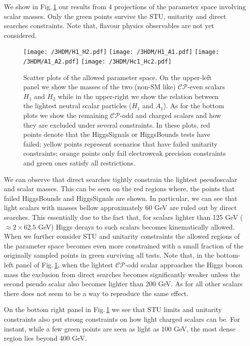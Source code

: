 \documentclass[10pt]{report}
\begin{document}
We show in Fig.\,\ref{fig:H1_A1_Plots} our results from 4 projections of the parameter space involving scalar masses. 
%
Only the green points survive the STU, unitarity and direct searches constraints. Note that, flavour physics observables are not yet considered.  
%
\begin{figure}[!htb]
	\centering
	\texttt{[image: /3HDM/H1\_H2.pdf]}
	\texttt{[image: /3HDM/H1\_A1.pdf]}
	\texttt{[image: /3HDM/A1\_A2.pdf]}
	\texttt{[image: /3HDM/Hc1\_Hc2.pdf]}
	\caption{Scatter plots of the allowed parameter space. On the upper-left panel we show the masses of the two (non-SM like) $\mathcal{CP}$-even scalars $H_1$ and $H_2$ while in the upper-right we show the relation between the lightest neutral scalar particles ($H_1$ and $A_1$). As for the bottom plots we show the remaining $\mathcal{CP}$-odd and charged scalars and how they are excluded under several constraints. In these plots, red points denote that the HiggsSignals or HiggsBounds tests have failed; yellow points represent scenarios that have failed unitarity constraints; orange points only fail electroweak precision constraints and green ones satisfy all restrictions.}
	\label{fig:H1_A1_Plots}
\end{figure}	

We can observe that direct searches tightly constrain the lightest pseudoscalar and scalar masses.
%
This can be seen on the red regions where, the points that failed HiggsBounds and HiggsSignals are shown. 
%
In particular, we can see that light scalars with masses bellow approximately 60 GeV are ruled out by direct searches. This essentially due to the fact that, for scalars lighter than 125 GeV ($\approx 2 \times 62.5$ GeV) Higgs decays to such scalars becomes kinematically allowed.
%
When we further consider STU and unitarity constraints the allowed regions of the parameter space becomes even more constrained with a small fraction of the originally sampled points in green surviving all tests.
%
Note that, in the bottom-left panel of Fig.\,\ref{fig:H1_A1_Plots}, when the lightest $\mathcal{CP}$-odd scalar approaches the Higgs boson mass the exclusion from direct searches becomes significantly weaker unless the second pseudo scalar also becomes lighter than 200 GeV. 
%
As for all other scalars there does not seem to be a way to reproduce the same effect. 

On the bottom right panel in Fig.\,\ref{fig:H1_A1_Plots} we see that STU limits and unitarity constraints also put strong constraints on how light charged scalars can be. 
%
For instant, while a few green points are seen as light as 100 GeV, the most dense region lies beyond 400 GeV. 
\end{document}

